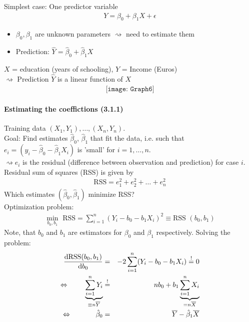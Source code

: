 \documentclass[11pt,a4paper,numbers=endperiod]{scrartcl}
\newcommand{\id}{\hspace*{4mm}}
\newcommand{\dif}{\mathrm{d}}
\newcommand{\tit}[1]{\begin{large} \underline{\text{#1}}\end{large}}
\begin{document}
Simplest case: One predictor variable \begin{align*}
	Y = \beta_0 + \beta_1 X + \epsilon
\end{align*} \begin{itemize}
	\item $\beta_0, \beta_1$ are unknown parameters $\rightsquigarrow$ need to estimate them
	\item Prediction: $\hat{Y} = \hat{\beta}_0 + \hat{\beta}_1 X$
\end{itemize}
\tit{Example:}\id $X$ = education (years of schooling), $Y$ = Income (Euros)\\
$\rightsquigarrow$ Prediction $\hat{Y}$ is a linear function of $X$\\

\begin{align*}
	\texttt{[image: Graph6]}
\end{align*}

\newpage
\paragraph{Estimating the coeffictions (3.1.1)}
$ $\\

Training data $(X_1, Y_1), \ldots, (X_n, Y_n)$.\\
Goal: Find estimates $\hat{\beta}_0$, $\hat{\beta}_1$ that fit the data, i.e. such that $e_i = (y_i - \hat{\beta}_0 - \hat{\beta}_1 X_i)$ is 'small' for $i = 1, \ldots, n$.\\
 $\rightsquigarrow e_i$ is the residual (difference between observation and prediction) for case $i$.\\
Residual sum of squares (RSS) is given by \begin{align*}
	\text{RSS} = e_1^2 + e_2^2 + \ldots + e_n^2
\end{align*}
Which estimates $(\hat{\beta}_0, \hat{\beta}_1)$ minimize RSS?\\

Optimization problem: \begin{align*}
	\min\limits_{b_0, b_1} \text{ RSS} = \sum\limits_{i = 1}^n (Y_i - b_0 - b_1 X_i)^2 \equiv \text{RSS } (b_0, b_1)
\end{align*}
Note, that $b_0$ and $b_1$ are estimators for $\beta_0$ and $\beta_1$ respectively. Solving the problem: 
\begin{eqnarray*}
	\frac{\dif \text{RSS}(b_0, b_1)}{\dif b_0} &=& -2 \sum\limits_{i = 1}^n (Y_i - b_0 - b_1 X_i) \overset{!}{=} 0\\
	\Leftrightarrow \id \id \underbrace{\sum\limits_{i = 1}^n Y_i}_{\equiv n \overline{Y}} &\overset{!}{=}& n b_0 + b_1 \underbrace{\sum\limits_{i = 1}^n X_i}_{= n \overline{X}}\\
	\Leftrightarrow \id \id \id  \hat{\beta}_0 &=& \overline{Y} - \hat{\beta}_1 \overline{X}
\end{eqnarray*}
\end{document}
